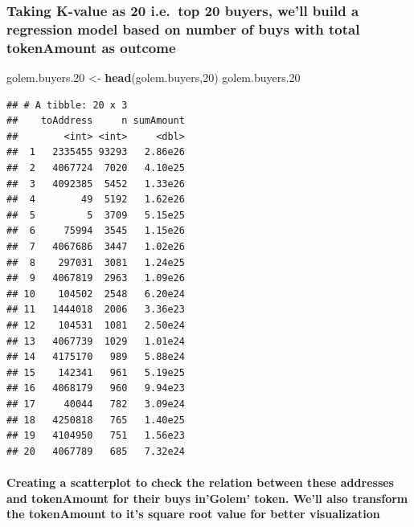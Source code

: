 \documentclass[]{article}
\newenvironment{Shaded}{\begin{snugshade}}{\end{snugshade}}
\newcommand{\KeywordTok}[1]{\textcolor[rgb]{0.13,0.29,0.53}{\textbf{#1}}}
\newcommand{\DecValTok}[1]{\textcolor[rgb]{0.00,0.00,0.81}{#1}}
\newcommand{\StringTok}[1]{\textcolor[rgb]{0.31,0.60,0.02}{#1}}
\newcommand{\NormalTok}[1]{#1}
\let\oldparagraph\paragraph
\renewcommand{\paragraph}[1]{\oldparagraph{#1}\mbox{}}
\begin{document}
\subsubsection{Taking K-value as 20 i.e.~top 20 buyers, we'll build a
regression model based on number of buys with total tokenAmount as
outcome}\label{taking-k-value-as-20-i.e.top-20-buyers-well-build-a-regression-model-based-on-number-of-buys-with-total-tokenamount-as-outcome}

\begin{Shaded}
\begin{Highlighting}[]
\NormalTok{golem.buyers.}\DecValTok{20}\NormalTok{ <-}\StringTok{ }\KeywordTok{head}\NormalTok{(golem.buyers,}\DecValTok{20}\NormalTok{)}
\NormalTok{golem.buyers.}\DecValTok{20}
\end{Highlighting}
\end{Shaded}

\begin{verbatim}
## # A tibble: 20 x 3
##    toAddress     n sumAmount
##        <int> <int>     <dbl>
##  1   2335455 93293   2.86e26
##  2   4067724  7020   4.10e25
##  3   4092385  5452   1.33e26
##  4        49  5192   1.62e26
##  5         5  3709   5.15e25
##  6     75994  3545   1.15e26
##  7   4067686  3447   1.02e26
##  8    297031  3081   1.24e25
##  9   4067819  2963   1.09e26
## 10    104502  2548   6.20e24
## 11   1444018  2006   3.36e23
## 12    104531  1081   2.50e24
## 13   4067739  1029   1.01e24
## 14   4175170   989   5.88e24
## 15    142341   961   5.19e25
## 16   4068179   960   9.94e23
## 17     40044   782   3.09e24
## 18   4250818   765   1.40e25
## 19   4104950   751   1.56e23
## 20   4067789   685   7.32e24
\end{verbatim}

\paragraph{Creating a scatterplot to check the relation between these
addresses and tokenAmount for their buys in'Golem' token. We'll also
transform the tokenAmount to it's square root value for better
visualization}\label{creating-a-scatterplot-to-check-the-relation-between-these-addresses-and-tokenamount-for-their-buys-ingolem-token.-well-also-transform-the-tokenamount-to-its-square-root-value-for-better-visualization}
\end{document}
